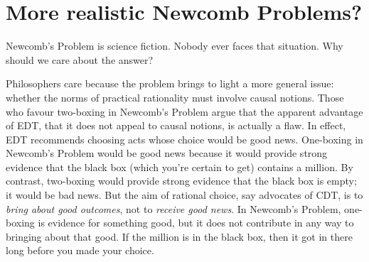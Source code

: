 
\section{More realistic Newcomb Problems?}

Newcomb's Problem is  science fiction. Nobody ever faces that
situation. Why should we care about the answer?

Philosophers care because the problem brings to light a more
general issue: whether the norms of practical rationality must
involve causal notions. Those who favour two-boxing in Newcomb's
Problem argue that the apparent advantage of EDT, that it does not
appeal to causal notions, is actually a flaw. In effect, EDT
recommends choosing acts whose choice would be good news. One-boxing
in Newcomb's Problem would be good news because it would provide
strong evidence that the black box (which you're certain to get)
contains a million. By contrast, two-boxing would provide strong
evidence that the black box is empty; it would be bad news. But the aim
of rational choice, say advocates of CDT, is to \emph{bring about good
  outcomes}, not to \emph{receive good news}. In Newcomb's Problem,
one-boxing is evidence for something good, but it does not contribute in
any way to bringing about that good. If the million is in the black
box, then it got in there long before you made your choice.

